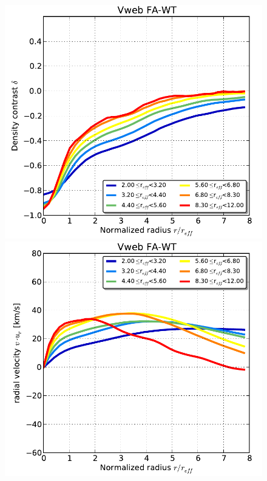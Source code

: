 \documentclass[a4,useAMS,usenatbib,usegraphicx]{latex/mn2e}
\begin{document}
\begin{flushleft}
\begin{figure}
  \includegraphics[trim = 1mm 0mm 5mm 0mm, clip, keepaspectratio=true,
  width=0.24\textheight]{./figures/voids_density_VwebFAG0.pdf}
  \includegraphics[trim = 1mm 0mm 5mm 0mm, clip, keepaspectratio=true,
  width=0.24\textheight]{./figures/voids_velocity_VwebFAG0.pdf}

\end{figure}
\end{flushleft}
\end{document}
